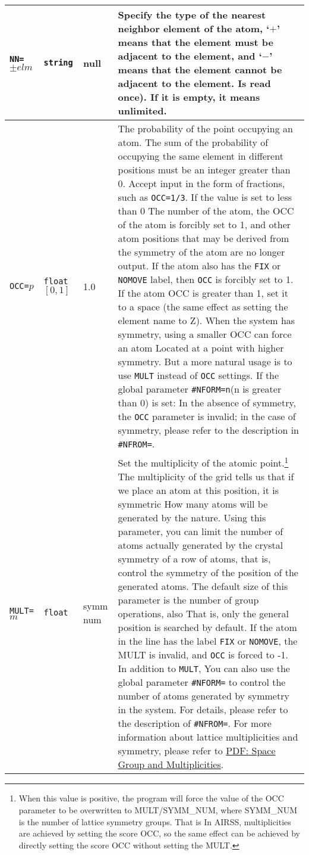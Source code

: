 \documentclass[a4paper, 10pt]{article}
\begin{document}
\begin{center}
\begin{longtable}{m{10em}|m{4em}<{\centering}|m{3em}<{\centering}|m{15em}}
\midrule
\verb|NN=|\(\pm{}elm\)  & \verb|string| & null & Specify the type of the nearest neighbor element of the atom, `\(+\)' means that the element must be adjacent to the element, and `\(-\)' means that the element cannot be adjacent to the element. Is read once). If it is empty, it means unlimited.\\
\midrule
\verb|OCC=|\(p\) & \verb|float| \([0,1]\) & 1.0 & The probability of the point occupying an atom. The sum of the probability of occupying the same element in different positions must be an integer greater than 0. Accept input in the form of fractions, such as \verb|OCC=1/3|. If the value is set to less than 0 The number of the atom, the OCC of the atom is forcibly set to 1, and other atom positions that may be derived from the symmetry of the atom are no longer output. If the atom also has the \verb|FIX| or \verb|NOMOVE| label, then \verb|OCC| is forcibly set to 1. If the atom OCC is greater than 1, set it to a space (the same effect as setting the element name to Z). When the system has symmetry, using a smaller OCC can force an atom Located at a point with higher symmetry. But a more natural usage is to use \verb|MULT| instead of \verb|OCC| settings. If the global parameter \verb|#NFORM=n|(n is greater than 0) is set: In the absence of symmetry, the \verb|OCC| parameter is invalid; in the case of symmetry, please refer to the description in \verb|#NFROM=|. \\
\midrule
\verb|MULT=|\(m\) & \verb|float| & symm num & Set the multiplicity of the atomic point.\footnote{When this value is positive, the program will force the value of the OCC parameter to be overwritten to MULT/SYMM\_NUM, where SYMM\_NUM is the number of lattice symmetry groups. That is In AIRSS, multiplicities are achieved by setting the score OCC, so the same effect can be achieved by directly setting the score OCC without setting the MULT.} The multiplicity of the grid tells us that if we place an atom at this position, it is symmetric How many atoms will be generated by the nature. Using this parameter, you can limit the number of atoms actually generated by the crystal symmetry of a row of atoms, that is, control the symmetry of the position of the generated atoms. The default size of this parameter is the number of group operations, also That is, only the general position is searched by default. If the atom in the line has the label \verb|FIX| or \verb|NOMOVE|, the MULT is invalid, and \verb|OCC| is forced to -1. In addition to \verb|MULT|, You can also use the global parameter \verb|#NFORM=| to control the number of atoms generated by symmetry in the system. For details, please refer to the description of \verb|#NFROM=|. For more information about lattice multiplicities and symmetry, please refer to \href{http://folk.ntnu.no/yingday/NilsYD/PhaseStructure/001Space_Groups.pdf}{PDF: Space Group and Multiplicities}.\\

\end{longtable}
\end{center}
\end{document}
